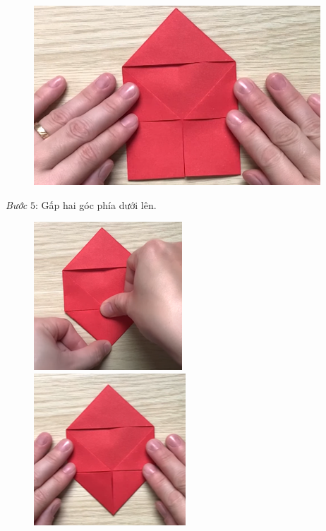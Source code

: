 \begin{multicols}{2}
\begin{figure}[H]
		\vspace*{1pt}
		\includegraphics[width=1\linewidth]{28}
		\vspace*{-10pt}
	\end{figure}
	\textit{Bước} $5$: Gấp hai góc phía dưới lên.
	\begin{figure}[H]
		\vspace*{-5pt}
		\centering
		\captionsetup{labelformat= empty, justification=centering}
		\includegraphics[height= 0.485\linewidth]{29}
		\includegraphics[height= 0.485\linewidth]{30}
		\vspace*{-10pt}

\end{figure}
\end{multicols}
